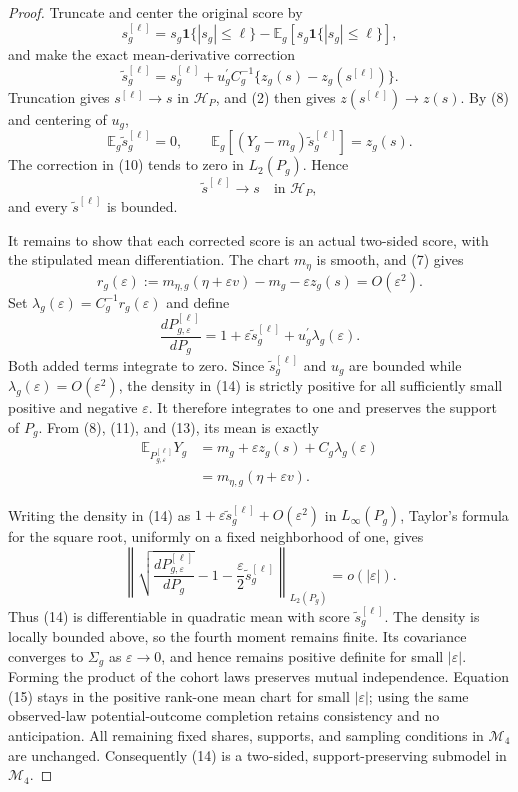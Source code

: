 \documentclass{article}
\begin{document}
\begin{proof}
Truncate and center the original score by
\[
s_g^{[\ell]}
=s_g\mathbf 1\{|s_g|\le\ell\}
-\mathbb E_g[s_g\mathbf 1\{|s_g|\le\ell\}],
\]
and make the exact mean-derivative correction
\[
\widetilde s_g^{[\ell]}
=s_g^{[\ell]}
+u_g^{\prime}C_g^{-1}\{z_g(s)-z_g(s^{[\ell]})\}.                       \tag{10}
\]
Truncation gives \(s^{[\ell]}\to s\) in \(\mathcal H_P\), and (2) then gives
\(z(s^{[\ell]})\to z(s)\).  By (8) and centering of \(u_g\),
\[
\mathbb E_g\widetilde s_g^{[\ell]}=0,
\qquad
\mathbb E_g[(Y_g-m_g)\widetilde s_g^{[\ell]}]=z_g(s).                 \tag{11}
\]
The correction in (10) tends to zero in \(L_2(P_g)\).  Hence
\[
\widetilde s^{[\ell]}\longrightarrow s
\quad\text{in }\mathcal H_P,                                          \tag{12}
\]
and every \(\widetilde s^{[\ell]}\) is bounded.

It remains to show that each corrected score is an actual two-sided score, with the stipulated mean differentiation.  The chart \(m_\eta\) is smooth, and (7) gives
\[
r_g(\varepsilon)
:=m_{\eta,g}(\eta+\varepsilon v)-m_g-\varepsilon z_g(s)
=O(\varepsilon^2).                                                       \tag{13}
\]
Set \(\lambda_g(\varepsilon)=C_g^{-1}r_g(\varepsilon)\) and define
\[
\frac{dP_{g,\varepsilon}^{[\ell]}}{dP_g}
=1+\varepsilon\widetilde s_g^{[\ell]}
+u_g^{\prime}\lambda_g(\varepsilon).                                  \tag{14}
\]
Both added terms integrate to zero.  Since \(\widetilde s_g^{[\ell]}\) and \(u_g\) are bounded while \(\lambda_g(\varepsilon)=O(\varepsilon^2)\), the density in (14) is strictly positive for all sufficiently small positive and negative \(\varepsilon\).  It therefore integrates to one and preserves the support of \(P_g\).  From (8), (11), and (13), its mean is exactly
\[
\begin{aligned}
\mathbb E_{P_{g,\varepsilon}^{[\ell]}}Y_g
&=m_g+\varepsilon z_g(s)+C_g\lambda_g(\varepsilon)\\
&=m_{\eta,g}(\eta+\varepsilon v).                                    \tag{15}
\end{aligned}
\]

Writing the density in (14) as \(1+\varepsilon\widetilde s_g^{[\ell]}+O(\varepsilon^2)\) in \(L_\infty(P_g)\), Taylor's formula for the square root, uniformly on a fixed neighborhood of one, gives
\[
\left\|
\sqrt{\frac{dP_{g,\varepsilon}^{[\ell]}}{dP_g}}
-1-\frac{\varepsilon}{2}\widetilde s_g^{[\ell]}
\right\|_{L_2(P_g)}=o(|\varepsilon|).                                  \tag{16}
\]
Thus (14) is differentiable in quadratic mean with score \(\widetilde s_g^{[\ell]}\).  The density is locally bounded above, so the fourth moment remains finite.  Its covariance converges to \(\Sigma_g\) as \(\varepsilon\to0\), and hence remains positive definite for small \(|\varepsilon|\).  Forming the product of the cohort laws preserves mutual independence.  Equation (15) stays in the positive rank-one mean chart for small \(|\varepsilon|\); using the same observed-law potential-outcome completion retains consistency and no anticipation.  All remaining fixed shares, supports, and sampling conditions in \(\mathcal M_4\) are unchanged.  Consequently (14) is a two-sided, support-preserving submodel in \(\mathcal M_4\).


\end{proof}
\end{document}
